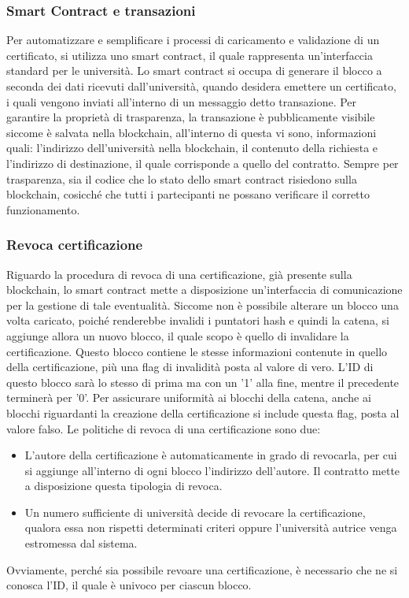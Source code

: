 \documentclass[a4paper,12pt]{article}
\begin{document}
\subsubsection{Smart Contract e transazioni}
Per automatizzare e semplificare i processi di caricamento e validazione di un certificato, si utilizza uno smart contract, il quale rappresenta un'interfaccia standard per le università. Lo smart contract si occupa di generare il blocco a seconda dei dati ricevuti dall'università, quando desidera emettere un certificato, i quali vengono inviati all'interno di un messaggio detto transazione.
\newline Per garantire la proprietà di trasparenza, la transazione è pubblicamente visibile siccome è salvata nella blockchain, all'interno di questa vi sono, informazioni quali: l'indirizzo dell'università nella blockchain, il contenuto della richiesta e l'indirizzo di destinazione, il quale corrisponde a quello del contratto. 
\newline Sempre per trasparenza, sia il codice che lo stato dello smart contract risiedono sulla blockchain, cosicché che tutti i partecipanti ne possano verificare il corretto funzionamento.
\subsubsection{Revoca certificazione}
Riguardo la procedura di revoca di una certificazione, già presente sulla blockchain, lo smart contract mette a disposizione un'interfaccia di comunicazione per la gestione di tale eventualità.
\newline Siccome non è possibile alterare un blocco una volta caricato, poiché renderebbe invalidi i puntatori hash e quindi la catena, si aggiunge allora un nuovo blocco, il quale scopo è quello di invalidare la certificazione. Questo blocco contiene le stesse informazioni contenute in quello della certificazione, più una flag di invalidità posta al valore di vero. L'ID di questo blocco sarà lo stesso di prima ma con un '1' alla fine, mentre il precedente terminerà per '0'.
\newline Per assicurare uniformità ai blocchi della catena, anche ai blocchi riguardanti la creazione della certificazione si include questa flag, posta al valore falso.
\newline Le politiche di revoca di una certificazione sono due: 
\begin{itemize}
    \item L'autore della certificazione è automaticamente in grado di revocarla, per cui si aggiunge all'interno di ogni blocco l'indirizzo dell'autore. Il contratto mette a disposizione questa tipologia di revoca.
    \item Un numero sufficiente di università decide di revocare la certificazione, qualora essa non rispetti determinati criteri oppure l'università autrice venga estromessa dal sistema. 
\end{itemize}
Ovviamente, perché sia possibile revoare una certificazione, è necessario che ne si conosca l'ID, il quale è univoco per ciascun blocco.
\end{document}
